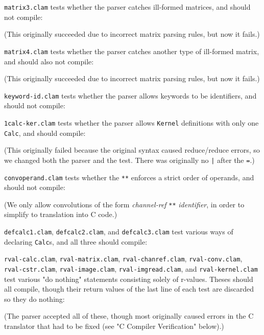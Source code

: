 \texttt{matrix3.clam} tests whether the parser catches ill-formed matrices, and should not compile:

(This originally succeeded due to incorrect matrix parsing rules, but now it fails.)

\texttt{matrix4.clam} tests whether the parser catches another type of ill-formed matrix, and should also not compile:

(This originally succeeded due to incorrect matrix parsing rules, but now it fails.)

\texttt{keyword-id.clam} tests whether the parser allows keywords to be identifiers, and should not compile:


\texttt{1calc-ker.clam} tests whether the parser allows \texttt{Kernel} definitions with only one \texttt{Calc}, and should compile:

(This originally failed because the original syntax caused reduce/reduce errors, so we changed both the parser and the test.
There was originally no \texttt{|} after the \texttt{=}.)

\texttt{convoperand.clam} tests whether the \texttt{**} enforces a strict order of operands, and should not compile:

(We only allow convolutions of the form \emph{channel-ref} \texttt{**} \emph{identifier}, in order to simplify
to translation into C code.)

\texttt{defcalc1.clam}, \texttt{defcalc2.clam}, and \texttt{defcalc3.clam} test various ways of declaring \texttt{Calc}s,
and all three should compile:




\texttt{rval-calc.clam}, \texttt{rval-matrix.clam}, \texttt{rval-chanref.clam}, \texttt{rval-conv.clam},
\texttt{rval-cstr.clam}, \texttt{rval-image.clam}, \texttt{rval-imgread.clam}, and \texttt{rval-kernel.clam}
test various "do nothing" statements consisting solely of r-values. Theses should all compile, though their
return values of the last line of each test are discarded so they do nothing:








(The parser accepted all of these, though most originally caused errors in the C translator
that had to be fixed (see "C Compiler Verification" below).)

